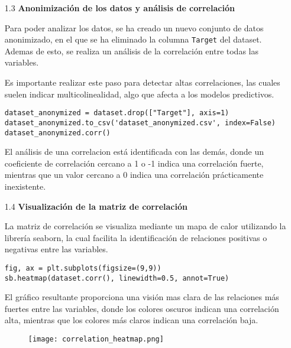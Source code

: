 \documentclass{article}
\begin{document}
\bigskip

\begin{itemize}

\item[1.3]  {\bf Anonimizaci\'on de los datos y an\'alisis de correlaci\'on}

Para poder analizar los datos, se ha creado un nuevo conjunto de datos anonimizado, en el que se ha eliminado la columna \texttt{Target} del dataset. Ademas de esto, se realiza un an\'alisis de la correlaci\'on entre todas las variables.

Es importante realizar este paso para detectar altas correlaciones, las cuales suelen indicar multicolinealidad, algo que afecta a los modelos predictivos.

\begin{tcolorbox}[width=14cm]
\begin{scriptsize}
\begin{verbatim}
dataset_anonymized = dataset.drop(["Target"], axis=1)
dataset_anonymized.to_csv('dataset_anonymized.csv', index=False)
dataset_anonymized.corr()
\end{verbatim}
\end{scriptsize}
\end{tcolorbox}

El an\'alisis de una correlacion est\'a identificada con las dem\'as, donde un coeficiente de correlaci\'on cercano a 1 o -1 indica una correlaci\'on fuerte, mientras que un valor cercano a 0 indica una correlaci\'on pr\'acticamente inexistente.

\end{itemize}

\newpage

\begin{itemize}

\item[1.4]  {\bf Visualizaci\'on de la matriz de correlaci\'on}

La matriz de correlaci\'on se visualiza mediante un mapa de calor utilizando la librer\'ia seaborn, la cual facilita la identificaci\'on de relaciones positivas o negativas entre las variables.

\begin{tcolorbox}[width=14cm]
\begin{scriptsize}
\begin{verbatim}
fig, ax = plt.subplots(figsize=(9,9))
sb.heatmap(dataset.corr(), linewidth=0.5, annot=True)
\end{verbatim}
\end{scriptsize}
\end{tcolorbox}

El gr\'afico resultante proporciona una visi\'on mas clara de las relaciones m\'as fuertes entre las variables, donde los colores oscuros indican una correlaci\'on alta, mientras que los colores m\'as claros indican una correlaci\'on baja.

\begin{figure}[h]
  \centering
  \texttt{[image: correlation\_heatmap.png]}
\end{figure}

\end{itemize}
\end{document}
